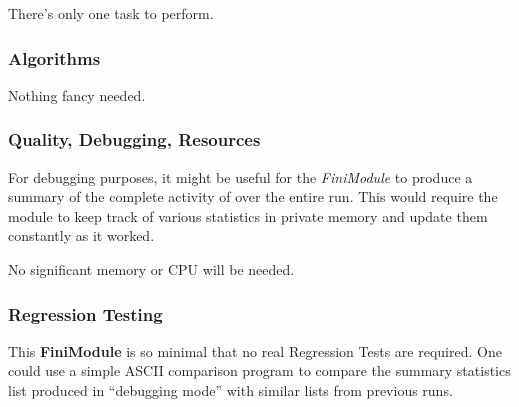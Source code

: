   There's only one task to perform.

\subsubsection {Algorithms}

  Nothing fancy needed.

\subsubsection {Quality, Debugging, Resources}

  For debugging purposes, it might be useful for the {\it FiniModule}
to produce a summary of the complete activity of \fbs over the
entire run.  This would require the \fbs module to keep track
of various statistics in private memory and update them constantly
as it worked.

  No significant memory or CPU will be needed.

\subsubsection {Regression Testing}

  This {\bf FiniModule} is so minimal that no real Regression
Tests are required.  One could use a simple ASCII comparison
program to compare the summary statistics list produced
in ``debugging mode'' with similar lists from previous runs.

